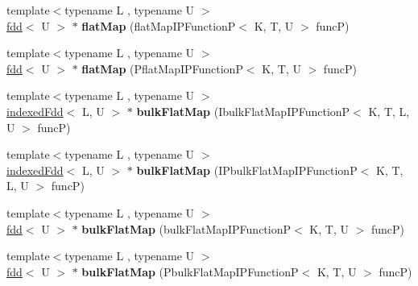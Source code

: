 \begin{DoxyCompactItemize}
\item 
\hypertarget{classfaster_1_1indexedFdd_3_01K_00_01T_01_5_01_4_a09c9506df40a80d2bcce454bc920596e}{}{\footnotesize template$<$typename L , typename U $>$ }\\\hyperlink{classfaster_1_1fdd}{fdd}$<$ U $>$ $\ast$ {\bfseries flat\+Map} (flat\+Map\+I\+P\+Function\+P$<$ K, T, U $>$ func\+P)\label{classfaster_1_1indexedFdd_3_01K_00_01T_01_5_01_4_a09c9506df40a80d2bcce454bc920596e}

\item 
\hypertarget{classfaster_1_1indexedFdd_3_01K_00_01T_01_5_01_4_aa648f93a40fbbaf5243f1694312ea02f}{}{\footnotesize template$<$typename L , typename U $>$ }\\\hyperlink{classfaster_1_1fdd}{fdd}$<$ U $>$ $\ast$ {\bfseries flat\+Map} (Pflat\+Map\+I\+P\+Function\+P$<$ K, T, U $>$ func\+P)\label{classfaster_1_1indexedFdd_3_01K_00_01T_01_5_01_4_aa648f93a40fbbaf5243f1694312ea02f}

\item 
\hypertarget{classfaster_1_1indexedFdd_3_01K_00_01T_01_5_01_4_af3376937665a44f002412304798e6309}{}{\footnotesize template$<$typename L , typename U $>$ }\\\hyperlink{classfaster_1_1indexedFdd}{indexed\+Fdd}$<$ L, U $>$ $\ast$ {\bfseries bulk\+Flat\+Map} (Ibulk\+Flat\+Map\+I\+P\+Function\+P$<$ K, T, L, U $>$ func\+P)\label{classfaster_1_1indexedFdd_3_01K_00_01T_01_5_01_4_af3376937665a44f002412304798e6309}

\item 
\hypertarget{classfaster_1_1indexedFdd_3_01K_00_01T_01_5_01_4_ad584c7680b9f99bbdf7bc3f0fa91aeb4}{}{\footnotesize template$<$typename L , typename U $>$ }\\\hyperlink{classfaster_1_1indexedFdd}{indexed\+Fdd}$<$ L, U $>$ $\ast$ {\bfseries bulk\+Flat\+Map} (I\+Pbulk\+Flat\+Map\+I\+P\+Function\+P$<$ K, T, L, U $>$ func\+P)\label{classfaster_1_1indexedFdd_3_01K_00_01T_01_5_01_4_ad584c7680b9f99bbdf7bc3f0fa91aeb4}

\item 
\hypertarget{classfaster_1_1indexedFdd_3_01K_00_01T_01_5_01_4_a1218ea8212678d867f9bcdb83a0374b9}{}{\footnotesize template$<$typename L , typename U $>$ }\\\hyperlink{classfaster_1_1fdd}{fdd}$<$ U $>$ $\ast$ {\bfseries bulk\+Flat\+Map} (bulk\+Flat\+Map\+I\+P\+Function\+P$<$ K, T, U $>$ func\+P)\label{classfaster_1_1indexedFdd_3_01K_00_01T_01_5_01_4_a1218ea8212678d867f9bcdb83a0374b9}

\item 
\hypertarget{classfaster_1_1indexedFdd_3_01K_00_01T_01_5_01_4_a45def85f2fa284d9a8803c9c360cb8fb}{}{\footnotesize template$<$typename L , typename U $>$ }\\\hyperlink{classfaster_1_1fdd}{fdd}$<$ U $>$ $\ast$ {\bfseries bulk\+Flat\+Map} (Pbulk\+Flat\+Map\+I\+P\+Function\+P$<$ K, T, U $>$ func\+P)\label{classfaster_1_1indexedFdd_3_01K_00_01T_01_5_01_4_a45def85f2fa284d9a8803c9c360cb8fb}


\end{DoxyCompactItemize}
